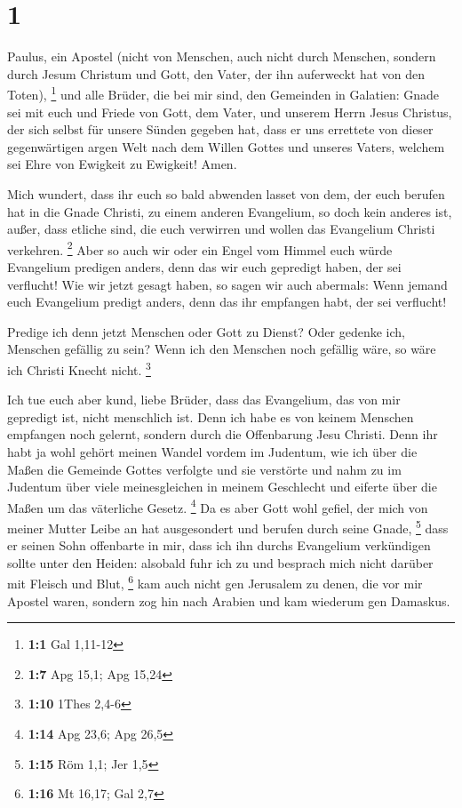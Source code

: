 \hypertarget{section}{%
\section{1}\label{section}}

 Paulus, ein Apostel (nicht von Menschen, auch nicht durch
Menschen, sondern durch Jesum Christum und Gott, den Vater, der ihn
auferweckt hat von den Toten), \footnote{\textbf{1:1} Gal 1,11-12}
 und alle Brüder, die bei mir sind, den Gemeinden in
Galatien:  Gnade sei mit euch und Friede von Gott, dem
Vater, und unserem Herrn Jesus Christus,  der sich selbst
für unsere Sünden gegeben hat, dass er uns errettete von dieser
gegenwärtigen argen Welt nach dem Willen Gottes und unseres Vaters,
 welchem sei Ehre von Ewigkeit zu Ewigkeit! Amen.

 Mich wundert, dass ihr euch so bald abwenden lasset von
dem, der euch berufen hat in die Gnade Christi, zu einem anderen
Evangelium,  so doch kein anderes ist, außer, dass etliche
sind, die euch verwirren und wollen das Evangelium Christi verkehren.
\footnote{\textbf{1:7} Apg 15,1; Apg 15,24}  Aber so auch
wir oder ein Engel vom Himmel euch würde Evangelium predigen anders,
denn das wir euch gepredigt haben, der sei verflucht!  Wie
wir jetzt gesagt haben, so sagen wir auch abermals: Wenn jemand euch
Evangelium predigt anders, denn das ihr empfangen habt, der sei
verflucht!

 Predige ich denn jetzt Menschen oder Gott zu Dienst? Oder
gedenke ich, Menschen gefällig zu sein? Wenn ich den Menschen noch
gefällig wäre, so wäre ich Christi Knecht nicht. \footnote{\textbf{1:10}
  1Thes 2,4-6}

 Ich tue euch aber kund, liebe Brüder, dass das Evangelium,
das von mir gepredigt ist, nicht menschlich ist.  Denn ich
habe es von keinem Menschen empfangen noch gelernt, sondern durch die
Offenbarung Jesu Christi.  Denn ihr habt ja wohl gehört
meinen Wandel vordem im Judentum, wie ich über die Maßen die Gemeinde
Gottes verfolgte und sie verstörte  und nahm zu im Judentum
über viele meinesgleichen in meinem Geschlecht und eiferte über die
Maßen um das väterliche Gesetz. \footnote{\textbf{1:14} Apg 23,6; Apg
  26,5}  Da es aber Gott wohl gefiel, der mich von meiner
Mutter Leibe an hat ausgesondert und berufen durch seine Gnade,
\footnote{\textbf{1:15} Röm 1,1; Jer 1,5}  dass er seinen
Sohn offenbarte in mir, dass ich ihn durchs Evangelium verkündigen
sollte unter den Heiden: alsobald fuhr ich zu und besprach mich nicht
darüber mit Fleisch und Blut, \footnote{\textbf{1:16} Mt 16,17; Gal 2,7}
 kam auch nicht gen Jerusalem zu denen, die vor mir Apostel
waren, sondern zog hin nach Arabien und kam wiederum gen Damaskus.

